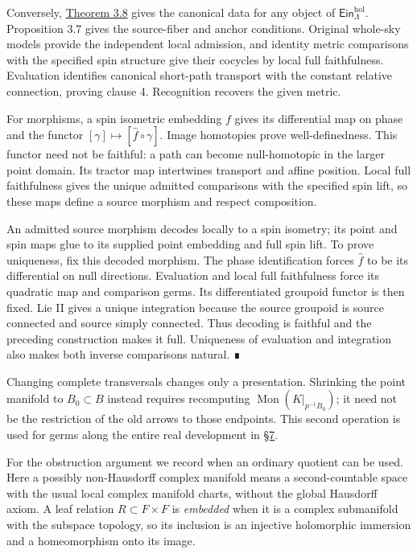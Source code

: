 \documentclass[
  english,
  11pt,
  reqno]{amsart}
\begin{document}
Conversely, \hyperref[thm:monodromy-affine-forward-construction]{Theorem
3.8} gives the canonical data for any object of
\(\mathsf{Ein}^{\mathrm{hol}}_\Lambda\). Proposition 3.7 gives the
source-fiber and anchor conditions. Original whole-sky models provide
the independent local admission, and identity metric comparisons with
the specified spin structure give their cocycles by local full
faithfulness. Evaluation identifies canonical short-path transport with
the constant relative connection, proving clause 4. Recognition recovers
the given metric.

For morphisms, a spin isometric embedding \(f\) gives its differential
map on phase and the functor \([\gamma]\mapsto[\widehat f\circ\gamma]\).
Image homotopies prove well-definedness. This functor need not be
faithful: a path can become null-homotopic in the larger point domain.
Its tractor map intertwines transport and affine position. Local full
faithfulness gives the unique admitted comparisons with the specified
spin lift, so these maps define a source morphism and respect
composition.

An admitted source morphism decodes locally to a spin isometry; its
point and spin maps glue to its supplied point embedding and full spin
lift. To prove uniqueness, fix this decoded morphism. The phase
identification forces \(\widehat f\) to be its differential on null
directions. Evaluation and local full faithfulness force its quadratic
map and comparison germs. Its differentiated groupoid functor is then
fixed. Lie II gives a unique integration because the source groupoid is
source connected and source simply connected. Thus decoding is faithful
and the preceding construction makes it full. Uniqueness of evaluation
and integration also makes both inverse comparisons natural. ∎

Changing complete transversals changes only a presentation. Shrinking
the point manifold to \(B_0\subset B\) instead requires recomputing
\(\operatorname{Mon}(K|_{p^{-1}B_0})\); it need not be the restriction
of the old arrows to those endpoints. This second operation is used for
germs along the entire real development in
\hyperref[sec:germ-correspondence-v08]{§7}.

For the obstruction argument we record when an ordinary quotient can be
used. Here a possibly non-Hausdorff complex manifold means a
second-countable space with the usual local complex manifold charts,
without the global Hausdorff axiom. A leaf relation
\(R\subset F\times F\) is \emph{embedded} when it is a complex
submanifold with the subspace topology, so its inclusion is an injective
holomorphic immersion and a homeomorphism onto its image.
\end{document}
